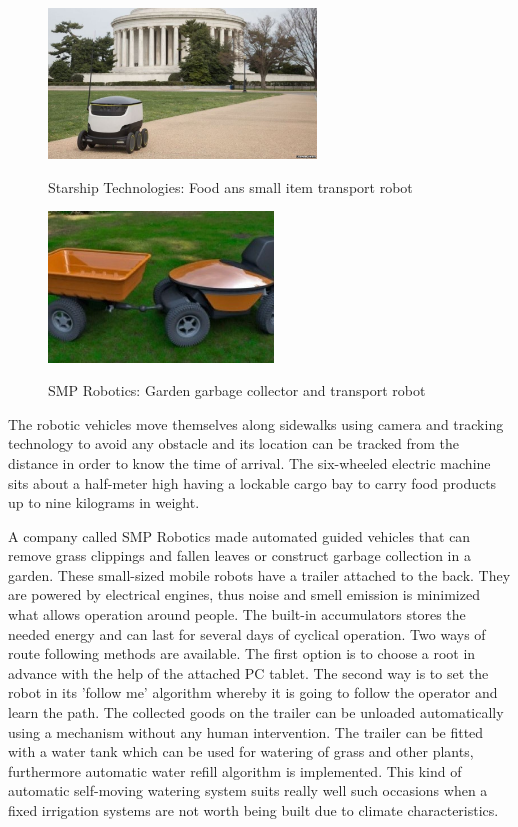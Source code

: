 \documentclass[12pt,english,twoside]{article}
\begin{document}
\begin{figure}[htb!]
	\centering
	\includegraphics[height=4cm]{figures/starship.jpg}
	\label{fig1}
	\caption{Starship Technologies: Food ans small item transport robot \cite{starship}}
	\endminipage\hfill
	\centering
	\includegraphics[height=4cm]{figures/smp.jpg}
	\label{smp}
	\caption{SMP Robotics: Garden garbage collector and transport robot \cite{smp}}
	\endminipage\hfill
\end{figure} 
The robotic vehicles move themselves along sidewalks using camera and tracking technology to avoid any obstacle and its location can be tracked from the distance in order to know the time of arrival. The six-wheeled electric machine sits about a half-meter high having a lockable cargo bay to carry food products up to nine kilograms in weight.\cite{starship}

A company called SMP Robotics made automated guided vehicles that can remove grass clippings and fallen leaves or construct garbage collection in a garden. These small-sized mobile robots have a trailer attached to the back. They are powered by electrical engines, thus noise and smell emission is minimized what allows operation around people. The built-in accumulators stores the needed energy and can last for several days of cyclical operation. Two ways of route following methods are available. The first option is to choose a root in advance with the help of the attached PC tablet. The second way is to set the robot in its 'follow me' algorithm whereby it is going to follow the operator and learn the path. The collected goods on the trailer can be unloaded automatically using a mechanism without any human intervention. The trailer can be fitted with a water tank which can be used for watering of grass and other plants, furthermore automatic water refill algorithm is implemented. This kind of automatic self-moving watering system suits really well such occasions when a fixed irrigation systems are not worth being built due to climate characteristics.\cite{smp}
\end{document}
